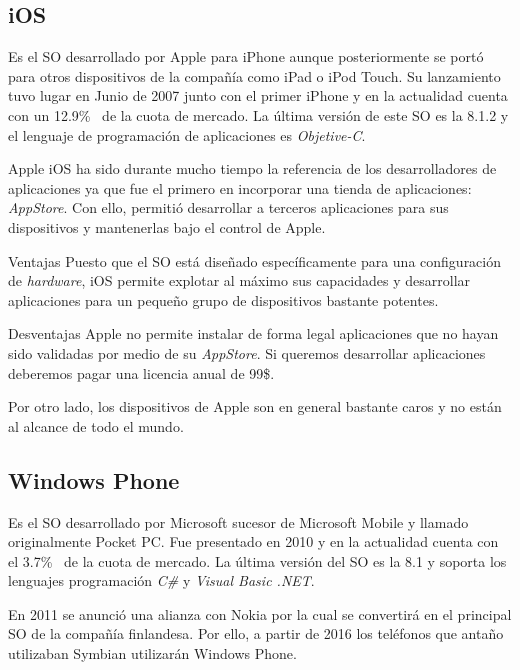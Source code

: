 \subsection{iOS}

Es el \acs{SO} desarrollado por Apple para iPhone aunque posteriormente se portó para otros
dispositivos de la compañía como iPad o iPod Touch. Su lanzamiento tuvo lugar en Junio de 2007 junto
con el primer iPhone y en la actualidad cuenta con un 12.9\%~\cite{Llamas13} de la cuota de
mercado. La última versión de este \acs{SO} es la 8.1.2 y el lenguaje de programación de
aplicaciones es \emph{Objetive-C}.

Apple iOS ha sido durante mucho tiempo la referencia de los desarrolladores de aplicaciones ya que
fue el primero en incorporar una tienda de aplicaciones: \emph{AppStore}. Con ello, permitió
desarrollar a terceros aplicaciones para sus dispositivos y mantenerlas bajo el control de Apple.

\begin{definitionlist}
  \item[Ventajas] Puesto que el \acs{SO} está diseñado específicamente para una configuración de
    \emph{hardware}, iOS permite explotar al máximo sus capacidades y desarrollar aplicaciones para
    un pequeño grupo de dispositivos bastante potentes.

  \item[Desventajas] Apple no permite instalar de forma legal aplicaciones que no hayan sido
    validadas por medio de su \emph{AppStore}. Si queremos desarrollar aplicaciones deberemos pagar
    una licencia anual de 99\$.

    Por otro lado, los dispositivos de Apple son en general bastante caros y no están al alcance de
    todo el mundo.

\end{definitionlist}

\subsection{Windows Phone}

Es el \acs{SO} desarrollado por Microsoft sucesor de Microsoft Mobile y llamado originalmente Pocket
PC. Fue presentado en 2010 y en la actualidad cuenta con el 3.7\%~\cite{Llamas13} de la cuota de
mercado. La última versión del \acs{SO} es la 8.1 y soporta los lenguajes programación \emph{C\#} y
\emph{Visual Basic .NET}.

En 2011 se anunció una alianza con Nokia por la cual se convertirá en el principal \acs{SO} de la
compañía finlandesa. Por ello, a partir de 2016 los teléfonos que antaño utilizaban Symbian
utilizarán Windows Phone.

